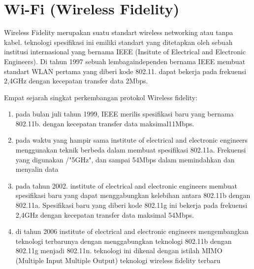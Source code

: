 
\section {Wi-Fi (Wireless Fidelity)}
Wireless Fidelity merupakan suatu standart wireless networking atau tanpa kabel. teknologi spesifikasi ini emiliki standart yang 
ditetapkan oleh sebuah institusi internasional yang bernama IEEE  (Insitute of Electrical and Electronic Engineers). Di tahun 1997 
sebuah lembagaindependen bernama IEEE membuat standart WLAN pertama yang diberi kode 802.11. dapat bekerja pada frekuensi 2,4GHz 
dengan kecepatan transfer data 2Mbps.

Empat sejarah singkat perkembangan protokol Wireless fidelity:
\begin{enumerate}

\item pada bulan juli tahun 1999, IEEE merilis spesifikasi baru yang bernama 802.11b. dengan kecepatan transfer data maksimal11Mbps.

\item pada waktu yang hampir sama institute of electrical and electronic engineers menggunakan teknik berbeda dalam membuat spesifikasi 
802.11a. Frekuensi yang  digunakan /"5GHz", dan sampai 54Mbps dalam memindahkan dan menyalin data

\item pada tahun 2002. institute of electrical and electronic engineers membuat spesifikasi baru yang dapat menggabungkan kelebihan antara 
802.11b dengan 802.11a. Spesifikasi baru yang diberi kode 802.11g ini bekerja pada frekuensi 2,4GHz dengan kecepatan transfer data 
maksimal 54Mbps.

\item di tahun 2006 institute of electrical and electronic engineers mengembangkan teknologi terbarunya dengan menggabungkan teknologi 
802.11b dengan 802.11g menjadi 802.11n. teknologi ini dikenal dengan istilah MIMO (Multiple Input Multiple Output) teknologi wireless 
fidelity terbaru
 \end{enumerate}
